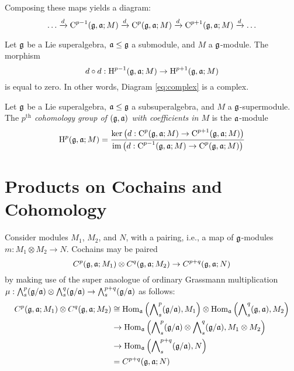 Composing these maps yields a diagram:
\begin{equation}\label{eq:complex}
  \ldots \xrightarrow{d} \C^{p-1}(\g,\a;M) \xrightarrow{d} \C^p(\g,\a;M) \xrightarrow{d} \C^{p+1}(\g,\a;M) \xrightarrow{d} \ldots
\end{equation}

\begin{proposition}
  Let $\g$ be a Lie superalgebra, $\a \leq \g$ a submodule, and $M$ a $\g$-module. The morphism
  \[
    d \circ d : \H^{p-1}(\g,\a;M) \to \H^{p+1}(\g,\a;M)
  \]
  is equal to zero. In other words, Diagram \ref{eq:complex} is a complex.
\end{proposition}

\begin{definition}
  Let $\g$ be a Lie superalgebra, $\a \leq \g$ a subsuperalgebra, and $M$ a $\g$-supermodule. The \emph{$p^\text{th}$ cohomology group of $(\g,\a)$ with coefficients in $M$} is the $\a$-module
  \[
    \H^p(\g,\a;M) = \frac{\ker\left(d:\C^p(\g,\a;M) \to \C^{p+1}(\g,\a;M)\right)}{\im \left(d:\C^{p-1}(\g,\a;M) \to \C^{p}(\g,\a;M)\right)}
  \]
  
\end{definition}

\section{Products on Cochains and Cohomology}
\label{sec:products}

Consider modules $M_1$, $M_2$, and $N$, with a pairing, i.e., a map of $\g$-modules $m:M_1 \otimes M_2 \to N$. Cochains may be paired
\[
  C^p(\g,\a;M_1) \otimes C^q(\g,\a;M_2) \to C^{p+q}(\g,\a;N)
\]
by making use of the super anaologue of ordinary Grassmann multiplication $\mu: \superext{p}(\g/\a) \otimes \superext{q}(\g/\a) \to \superext{p+q}(\g/\a)$ as follows:
\begin{align}
  \begin{split}
    C^p(\g,\a;M_1) \otimes C^q(\g,\a;M_2) &\cong \Hom_\a\left(\superext{p}(\g/\a),M_1\right) \otimes \Hom_\a\left(\superext{q}(\g,\a),M_2\right) \\
    & \to \Hom_\a\left( \superext{p}(\g/\a) \otimes \superext{q}(\g/\a), M_1 \otimes M_2 \right) \\
    & \to \Hom_\a\left( \superext{p+q}(\g/\a), N\right) \\
    &= C^{p+q}(\g,\a;N)
  \end{split}
\end{align}

